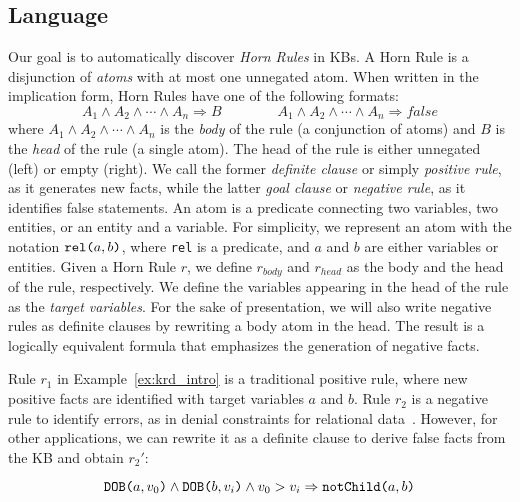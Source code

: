 \subsection{Language} \label{sec:krd_language} 
\vspace{-1ex}
Our goal is to automatically discover 
\emph{Horn Rules} in KBs. A Horn Rule is a disjunction of \emph{atoms} with at most one unnegated atom. When written in the implication form, Horn Rules have one of the following formats:
%
\begin{equation*}
	A_1 \wedge A_2 \wedge \cdots \wedge A_n \Rightarrow B \qquad \qquad A_1 \wedge A_2 \wedge \cdots \wedge A_n \Rightarrow  false 
\end{equation*} %
%
where $A_1 \wedge A_2 \wedge \cdots \wedge A_n$ is the \emph{body} of the rule (a conjunction of atoms) and $B$ is the \emph{head} of the rule (a single atom). The head of the rule is either unnegated (left) or empty (right). We call the former \emph{definite clause} or simply \emph{positive rule}, as it generates new 
facts, while the latter \emph{goal clause} or \emph{negative rule}, as it identifies false statements. %
An atom is a predicate connecting two variables, two entities, or an entity and a variable. For simplicity, we represent an atom with the notation $\texttt{rel(}a,b\texttt{)}$, where \texttt{rel} is a predicate, and $a$ and $b$ are either variables or entities. 
Given a Horn Rule $r$, we define $r_{body}$ and $r_{head}$ as the body and the head of the rule, respectively. We define the variables appearing in the head of the rule as the \emph{target variables}. 
For the sake of presentation, we will also write negative rules as definite clauses by rewriting a body atom %
in the head. The result is a logically equivalent formula that emphasizes the generation of negative facts.

\begin{example}\label{ex:ex2}
	Rule $r_1$ in Example~\ref{ex:krd_intro} is a traditional positive rule, where new positive facts are identified with target variables $a$ and $b$.
	Rule $r_2$ is a negative rule to identify errors, as in denial constraints for relational data~\cite{chu2013discovering}. However, for other applications, we can rewrite it as a definite clause to derive false facts from the KB and obtain $r_2'$:
	
	\vspace{-4ex}
	{\small	
		\begin{equation*}
			\texttt{DOB(}a,v_0\texttt{)} \wedge \texttt{DOB(}b,v_i\texttt{)} \wedge v_0 > v_i
			\Rightarrow  \texttt{notChild(}a,b\texttt{)}  
		\end{equation*}
	}
	\vspace{-3.5ex}
\end{example} 

